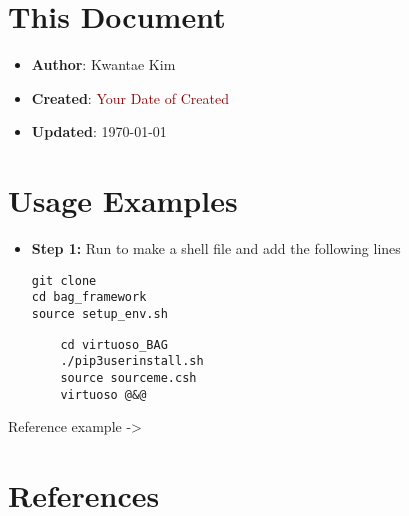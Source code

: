 \documentclass[a4paper,12pt]{article}
\begin{document}
\section*{This Document}

\begin{itemize}
    \item \textbf{Author}: Kwantae Kim
    \item \textbf{Created}: \textcolor{darkred}{Your Date of Created}
    \item \textbf{Updated}: \today
\end{itemize}

\tableofcontents

\pagebreak


\section{Usage Examples}

\begin{itemize}
    \item[\footnotesize\faCode] \textbf{Step 1:} Run  to make a shell file and add the following lines
          \vspace{-1em}\begin{verbatim}
git clone
cd bag_framework
source setup_env.sh
        \end{verbatim}
          \vspace{-1em}\begin{verbatim}
    cd virtuoso_BAG
    ./pip3userinstall.sh
    source sourceme.csh
    virtuoso @&@
        \end{verbatim}
\end{itemize}

Reference example -> \cite{razavi2017design}

\pagebreak
\section{References}
\printbibliography[heading=none]
\label{lastpage}        %
\end{document}

